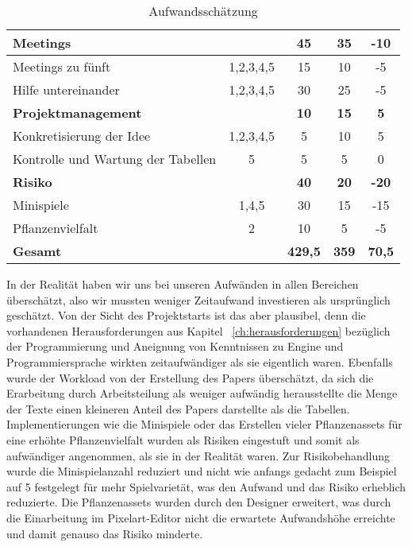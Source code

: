 \begin{table}[H]
\begin{tabular}{|l|c|c|c|c|}
        \hline
        \textbf{Meetings} & & \textbf{45} & \textbf{35} & \textbf{-10} \\
        \hline
        Meetings zu fünft & 1,2,3,4,5 & 15 & 10 & -5 \\
        Hilfe untereinander & 1,2,3,4,5 & 30 & 25 & -5 \\
        \hline
        \textbf{Projektmanagement} & & \textbf{10} & \textbf{15} & \textbf{5} \\
        \hline
        Konkretisierung der Idee & 1,2,3,4,5 & 5 & 10 & 5 \\
        Kontrolle und Wartung der Tabellen & 5 & 5 & 5 & 0 \\
        \hline
        \textbf{Risiko} & & \textbf{40} & \textbf{20} & \textbf{-20} \\
        \hline
        Minispiele & 1,4,5 & 30 & 15 & -15 \\
        Pflanzenvielfalt & 2 & 10 & 5 & -5 \\
        \hline
        \textbf{Gesamt} & & \textbf{429,5} & \textbf{359} & \textbf{70,5} \\
        \hline
    \end{tabular}
    \caption{Aufwandsschätzung}
\end{table}
In der Realität haben wir uns bei unseren Aufwänden in allen Bereichen überschätzt, also wir mussten weniger
Zeitaufwand investieren als ursprünglich geschätzt. 
Von der Sicht des Projektstarts ist das aber plausibel, denn die vorhandenen Herausforderungen aus Kapitel
~\ref{ch:herausforderungen} bezüglich der Programmierung und Aneignung von Kenntnissen zu Engine und Programmiersprache
wirkten zeitaufwändiger als sie eigentlich waren.
Ebenfalls wurde der Workload von der Erstellung des Papers überschätzt, da sich die Erarbeitung durch Arbeitsteilung 
als weniger aufwändig herausstellte die Menge der Texte einen kleineren Anteil des Papers darstellte als die Tabellen.
Implementierungen wie die Minispiele oder das Erstellen vieler Pflanzenassets für eine erhöhte Pflanzenvielfalt wurden 
als Risiken eingestuft und somit als aufwändiger angenommen, als sie in der Realität waren. 
Zur Risikobehandlung wurde die Minispielanzahl reduziert und nicht wie anfangs gedacht zum Beispiel auf 5 
festgelegt für mehr Spielvarietät, was den Aufwand und das Risiko erheblich reduzierte.
Die Pflanzenassets wurden durch den Designer erweitert, was durch die Einarbeitung im Pixelart-Editor 
nicht die erwartete Aufwandshöhe erreichte und damit genauso das Risiko minderte.\\ 